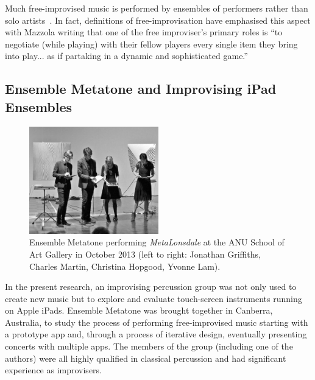\documentclass[graybox]{svmult}
\begin{document}
Much free-improvised music is performed by ensembles of performers
rather than solo artists~\cite{Stenstrom:2009xy}. In fact, definitions
of free-improvisation have emphasised this aspect with Mazzola writing
that one of the free improviser's primary roles is ``to negotiate
(while playing) with their fellow players every single item they bring
into play... as if partaking in a dynamic and sophisticated
game.''~\cite{Mazzola:2009cr} 

\subsection{Ensemble Metatone and Improvising iPad Ensembles}

\begin{figure}
  \centering
  \includegraphics[width=0.5\textwidth]{figures/ensemblemetatone-bw}
  \caption{Ensemble Metatone performing \emph{MetaLonsdale} at the ANU
    School of Art Gallery in October 2013 (left to right: Jonathan
    Griffiths, Charles Martin, Christina Hopgood, Yvonne Lam).}
  \label{ensemblemetatoneperforming}
\end{figure}

In the present research, an improvising percussion group was not only
used to create new music but to explore and evaluate touch-screen
instruments running on Apple iPads. Ensemble Metatone was brought
together in Canberra, Australia, to study the process of performing
free-improvised music starting with a prototype app and, through a
process of iterative design, eventually presenting concerts with
multiple apps. The members of the group (including one of the authors)
were all highly qualified in classical percussion and had significant
experience as improvisers.
\end{document}
